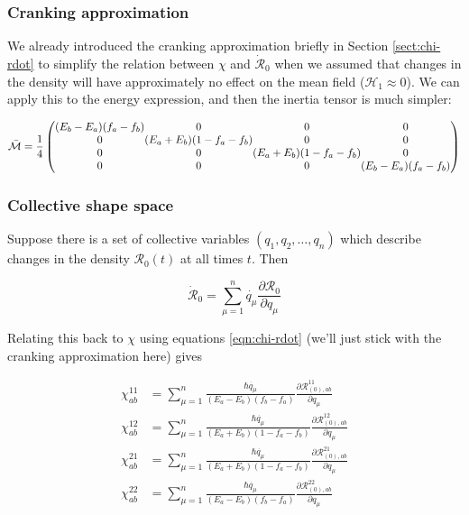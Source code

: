 \subsubsection{Cranking approximation}

We already introduced the cranking approximation briefly in Section \ref{sect:chi-rdot} to simplify the relation between $\chi$ and $\mathcal{\dot{R}}_0$ when we assumed that changes in the density will have approximately no effect on the mean field ($\mathcal{H}_1 \approx 0$). We can apply this to the energy expression, and then the inertia tensor is much simpler:

\begin{equation}\label{eqn:cranked_ATDHFB}
\mathcal{\bar{M}} = \frac{1}{4}\left(\begin{array}{@{}c@{}c@{}c@{}c@{}}
(E_b-E_a)(f_a-f_b) & 0                     & 0                     & 0 \\
0                  & (E_a+E_b)(1-f_a-f_b) & 0                     & 0 \\
0                  & 0                     & (E_a+E_b)(1-f_a-f_b)  & 0 \\
0                  & 0                     & 0                     & (E_b-E_a)(f_a-f_b)
\end{array}\right)
\end{equation}

\subsubsection{Collective shape space}

Suppose there is a set of collective variables $(q_1,q_2,\dots,q_n)$ which describe changes in the density $\mathcal{R}_0(t)$ at all times $t$. Then

\begin{equation}
\mathcal{\dot{R}}_0 = \sum_{\mu=1}^{n}\dot{q_\mu}\frac{\partial\mathcal{R}_0}{\partial q_\mu}
\end{equation}

\noindent Relating this back to $\chi$ using equations \ref{eqn:chi-rdot} (we'll just stick with the cranking approximation here) gives

\begin{align}
\chi^{11}_{ab} &= \sum_{\mu=1}^{n}\frac{\hbar\dot{q_\mu}}{(E_a-E_b)(f_b-f_a)}\frac{\partial\mathcal{R}^{11}_{(0),ab}}{\partial q_\mu} \\
\chi^{12}_{ab} &= \sum_{\mu=1}^{n}\frac{\hbar\dot{q_\mu}}{(E_a+E_b)(1-f_a-f_b)}\frac{\partial\mathcal{R}^{12}_{(0),ab}}{\partial q_\mu} \\
\chi^{21}_{ab} &= \sum_{\mu=1}^{n}\frac{\hbar\dot{q_\mu}}{(E_a+E_b)(1-f_a-f_b)}\frac{\partial\mathcal{R}^{21}_{(0),ab}}{\partial q_\mu} \\
\chi^{22}_{ab} &= \sum_{\mu=1}^{n}\frac{\hbar\dot{q_\mu}}{(E_a-E_b)(f_b-f_a)}\frac{\partial\mathcal{R}^{22}_{(0),ab}}{\partial q_\mu} \\
\end{align}


